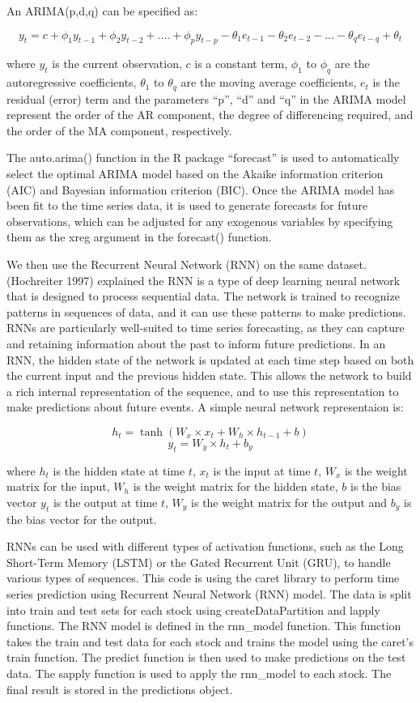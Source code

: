 \documentclass[
]{article}
\begin{document}
An ARIMA(p,d,q) can be specified as:

\[y_t = c + {\phi}_1y_{t-1} + {\phi}_2y_{t-2}+ .... +{\phi}_py_{t-p} - {\theta}_1e_{t-1} - {\theta}_2e_{t-2} - ... - {\theta}_qe_{t-q} + {\theta}_t\]

where \(y_t\) is the current observation, \(c\) is a constant term,
\({\phi}_1\) to \({\phi}_q\) are the autoregressive coefficients,
\({\theta}_1\) to \({\theta}_q\) are the moving average coefficients,
\(e_t\) is the residual (error) term and the parameters ``p'', ``d'' and
``q'' in the ARIMA model represent the order of the AR component, the
degree of differencing required, and the order of the MA component,
respectively.

The auto.arima() function in the R package ``forecast'' is used to
automatically select the optimal ARIMA model based on the Akaike
information criterion (AIC) and Bayesian information criterion (BIC).
Once the ARIMA model has been fit to the time series data, it is used to
generate forecasts for future observations, which can be adjusted for
any exogenous variables by specifying them as the xreg argument in the
forecast() function.

We then use the Recurrent Neural Network (RNN) on the same dataset.
(Hochreiter 1997) explained the RNN is a type of deep learning neural
network that is designed to process sequential data. The network is
trained to recognize patterns in sequences of data, and it can use these
patterns to make predictions. RNNs are particularly well-suited to time
series forecasting, as they can capture and retaining information about
the past to inform future predictions. In an RNN, the hidden state of
the network is updated at each time step based on both the current input
and the previous hidden state. This allows the network to build a rich
internal representation of the sequence, and to use this representation
to make predictions about future events. A simple neural network
representaion is:

\[h_t = \tanh(W_x \times x_t + W_h \times h_{t-1} + b)\]
\[y_t = W_y \times h_t + b_y\]

where \(h_t\) is the hidden state at time \(t\), \(x_t\) is the input at
time \(t\), \(W_x\) is the weight matrix for the input, \(W_h\) is the
weight matrix for the hidden state, \(b\) is the bias vector \(y_t\) is
the output at time \(t\), \(W_y\) is the weight matrix for the output
and \(b_y\) is the bias vector for the output.

RNNs can be used with different types of activation functions, such as
the Long Short-Term Memory (LSTM) or the Gated Recurrent Unit (GRU), to
handle various types of sequences. This code is using the caret library
to perform time series prediction using Recurrent Neural Network (RNN)
model. The data is split into train and test sets for each stock using
createDataPartition and lapply functions. The RNN model is defined in
the rnn\_model function. This function takes the train and test data for
each stock and trains the model using the caret's train function. The
predict function is then used to make predictions on the test data. The
sapply function is used to apply the rnn\_model to each stock. The final
result is stored in the predictions object.
\end{document}
